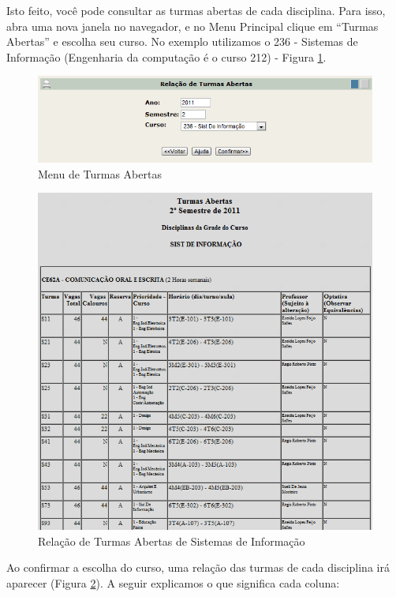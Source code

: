 \documentclass[a4paper,12pt,openany]{article}
\begin{document}
Isto feito, você pode consultar as turmas abertas de cada disciplina. Para isso, abra uma nova janela no navegador, e no Menu Principal clique em ``Turmas Abertas'' e escolha seu curso. No exemplo utilizamos o 236 - Sistemas de Informação (Engenharia da computação é o curso 212) - Figura \ref{turmasAbertasMenu}.

	\begin{figure}[ht!]  \centering
		\includegraphics[scale=0.8]{Turmas_Abertas_Menu.png}
		\caption{Menu de Turmas Abertas}
		\label{turmasAbertasMenu}
	\end{figure}

	\begin{figure}[ht!]  \centering
		\includegraphics[scale=0.9]{Turmas_Abertas_Tabela.png}
		\caption{Relação de Turmas Abertas de Sistemas de Informação}
		\label{turmasAbertasTabela}
	\end{figure}

Ao confirmar a escolha do curso, uma relação das turmas de cada disciplina irá aparecer (Figura \ref{turmasAbertasTabela}). A seguir explicamos o que significa cada coluna:
\end{document}
